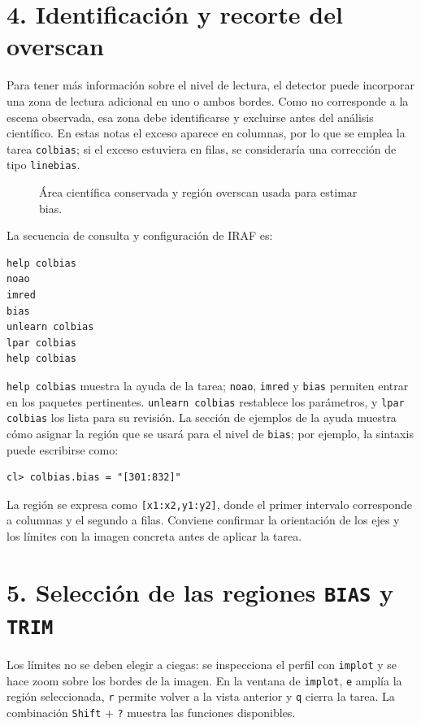\documentclass[11pt,twocolumn]{article}
\newcommand{\widefigure}[2]{\begin{figure}[!t]\centering\caption{#2}\end{figure}}
\begin{document}
\section*{4. Identificación y recorte del overscan}

Para tener más información sobre el nivel de lectura, el detector puede
incorporar una zona de lectura adicional en uno o ambos bordes. Como no
corresponde a la escena observada, esa zona debe identificarse y excluirse antes
del análisis científico. En estas notas el exceso aparece en columnas, por lo
que se emplea la tarea \texttt{colbias}; si el exceso estuviera en filas, se
consideraría una corrección de tipo \texttt{linebias}.

\widefigure{figuras/region_overscan.tex}{Área científica conservada y región overscan usada para estimar bias.}

La secuencia de consulta y configuración de IRAF es:

\begin{verbatim}
help colbias
noao
imred
bias
unlearn colbias
lpar colbias
help colbias
\end{verbatim}

\texttt{help colbias} muestra la ayuda de la tarea; \texttt{noao},
\texttt{imred} y \texttt{bias} permiten entrar en los paquetes pertinentes.
\texttt{unlearn colbias} restablece los parámetros, y \texttt{lpar colbias}
los lista para su revisión. La sección de ejemplos de la ayuda muestra cómo
asignar la región que se usará para el nivel de \texttt{bias}; por ejemplo, la
sintaxis puede escribirse como:

\begin{verbatim}
cl> colbias.bias = "[301:832]"
\end{verbatim}

La región se expresa como \texttt{[x1:x2,y1:y2]}, donde el primer intervalo
corresponde a columnas y el segundo a filas. Conviene confirmar la orientación
de los ejes y los límites con la imagen concreta antes de aplicar la tarea.

\section*{5. Selección de las regiones \texttt{BIAS} y \texttt{TRIM}}

Los límites no se deben elegir a ciegas: se inspecciona el perfil con
\texttt{implot} y se hace zoom sobre los bordes de la imagen. En la ventana de
\texttt{implot}, \texttt{e} amplía la región seleccionada, \texttt{r} permite
volver a la vista anterior y \texttt{q} cierra la tarea. La combinación
\texttt{Shift} + \texttt{?} muestra las funciones disponibles.
\end{document}
